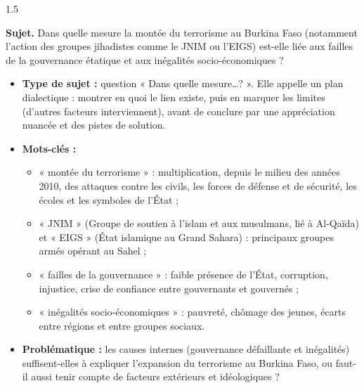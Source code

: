 \documentclass[12pt]{article}
\begin{document}
\begin{spacing}{1.5}

\noindent\textbf{Sujet.} Dans quelle mesure la montée du terrorisme au Burkina Faso (notamment l'action des groupes jihadistes comme le JNIM ou l'EIGS) est-elle liée aux failles de la gouvernance étatique et aux inégalités socio-économiques ?


\begin{itemize}
\item \textbf{Type de sujet :} question « Dans quelle mesure\dots ? ». Elle appelle un plan dialectique : montrer en quoi le lien existe, puis en marquer les limites (d'autres facteurs interviennent), avant de conclure par une appréciation nuancée et des pistes de solution.
\item \textbf{Mots-clés :}
  \begin{itemize}
  \item « montée du terrorisme » : multiplication, depuis le milieu des années 2010, des attaques contre les civils, les forces de défense et de sécurité, les écoles et les symboles de l'État ;
  \item « JNIM » (Groupe de soutien à l'islam et aux musulmans, lié à Al-Qaïda) et « EIGS » (État islamique au Grand Sahara) : principaux groupes armés opérant au Sahel ;
  \item « failles de la gouvernance » : faible présence de l'État, corruption, injustice, crise de confiance entre gouvernants et gouvernés ;
  \item « inégalités socio-économiques » : pauvreté, chômage des jeunes, écarts entre régions et entre groupes sociaux.
  \end{itemize}
\item \textbf{Problématique :} les causes internes (gouvernance défaillante et inégalités) suffisent-elles à expliquer l'expansion du terrorisme au Burkina Faso, ou faut-il aussi tenir compte de facteurs extérieurs et idéologiques ?
\end{itemize}



\end{spacing}
\end{document}

